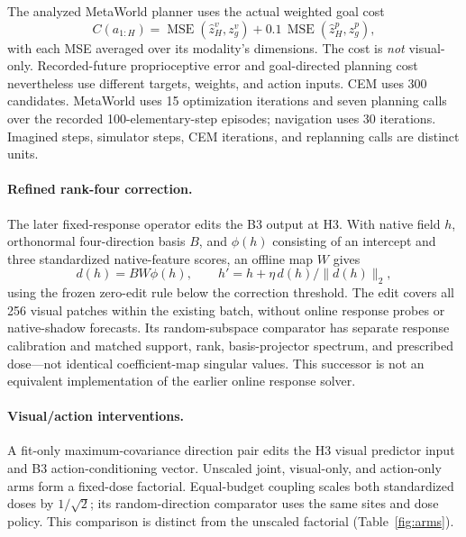 \documentclass{article}
\newcommand{\MSE}{\operatorname{MSE}}
\begin{document}
The analyzed MetaWorld planner uses the actual weighted goal cost
\begin{equation}
 C(a_{1:H})=\MSE(\hat z^v_H,z^v_g)+0.1\,\MSE(\hat z^p_H,z^p_g),
 \label{eq:cost}
\end{equation}
with each MSE averaged over its modality's dimensions. The cost is \emph{not} visual-only. Recorded-future proprioceptive error and goal-directed planning cost nevertheless use different targets, weights, and action inputs. CEM uses 300 candidates. MetaWorld uses 15 optimization iterations and seven planning calls over the recorded 100-elementary-step episodes; navigation uses 30 iterations. Imagined steps, simulator steps, CEM iterations, and replanning calls are distinct units.

\paragraph{Refined rank-four correction.}
The later fixed-response operator edits the B3 output at H3. With native field \(h\), orthonormal four-direction basis \(B\), and \(\phi(h)\) consisting of an intercept and three standardized native-feature scores, an offline map \(W\) gives
\begin{equation}
 d(h)=BW\phi(h),\qquad h'=h+\eta\,d(h)/\|d(h)\|_2,
 \label{eq:refined}
\end{equation}
using the frozen zero-edit rule below the correction threshold. The edit covers all 256 visual patches within the existing batch, without online response probes or native-shadow forecasts. Its random-subspace comparator has separate response calibration and matched support, rank, basis-projector spectrum, and prescribed dose---not identical coefficient-map singular values. This successor is not an equivalent implementation of the earlier online response solver.

\paragraph{Visual/action interventions.}
A fit-only maximum-covariance direction pair edits the H3 visual predictor input and B3 action-conditioning vector. Unscaled joint, visual-only, and action-only arms form a fixed-dose factorial. Equal-budget coupling scales both standardized doses by \(1/\sqrt{2}\); its random-direction comparator uses the same sites and dose policy. This comparison is distinct from the unscaled factorial (Table~\ref{fig:arms}).
\end{document}
